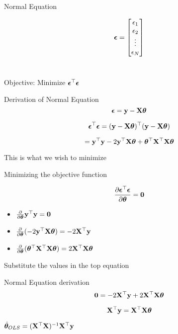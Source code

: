 \documentclass{beamer}
\begin{document}
\begin{frame}{Normal Equation}
    
\begin{equation*}
 \boldsymbol{\epsilon} = 
\begin{bmatrix}
    \epsilon_{1} \\
    \epsilon_{2} \\
    \vdots \\
    \epsilon_{N} \\
\end{bmatrix}
\end{equation*}
\\
\begin{center}
 \pause Objective:   Minimize $\boldsymbol{\epsilon}^\top\boldsymbol{\epsilon}$    
\end{center}
\end{frame}

\begin{frame}{Derivation of Normal Equation}
$$\boldsymbol{\epsilon} = \mathbf{y} - \mathbf{X}\boldsymbol{\theta}$$

$$\boldsymbol{\epsilon}^\top\boldsymbol{\epsilon} = (\mathbf{y} - \mathbf{X}\boldsymbol{\theta})^\top(\mathbf{y} - \mathbf{X}\boldsymbol{\theta})$$

$$= \mathbf{y}^\top\mathbf{y} - 2\mathbf{y}^\top\mathbf{X}\boldsymbol{\theta} + \boldsymbol{\theta}^\top\mathbf{X}^\top\mathbf{X}\boldsymbol{\theta}$$

This is what we wish to minimize
\end{frame}

\begin{frame}{Minimizing the objective function}
    
    
    $$\frac{\partial \boldsymbol{\epsilon}^\top \boldsymbol{\epsilon}}{\partial \boldsymbol{\theta}} = \mathbf{0}$$
    
    
    
    \begin{itemize}
        \item $\frac{\partial }{\partial \boldsymbol{\theta}} \mathbf{y}^\top\mathbf{y} = \mathbf{0}$
        \item $\frac{\partial }{\partial \boldsymbol{\theta}}(-2\mathbf{y}^\top\mathbf{X}\boldsymbol{\theta} ) = -2\mathbf{X}^\top\mathbf{y}$
        \item $\frac{\partial}{\partial\boldsymbol{\theta}} (\boldsymbol{\theta}^\top\mathbf{X}^\top\mathbf{X}\boldsymbol{\theta}) = 2\mathbf{X}^\top\mathbf{X}\boldsymbol{\theta}$
    \end{itemize}
    
    Substitute the values in the top equation
    
\end{frame}

\begin{frame}{Normal Equation derivation}
$$
    \mathbf{0} = -2\mathbf{X}^\top\mathbf{y} + 2\mathbf{X}^\top\mathbf{X}\boldsymbol{\theta}
$$

$$
    \mathbf{X}^\top\mathbf{y}  = \mathbf{X}^\top\mathbf{X}\boldsymbol{\theta}
$$

\begin{tcolorbox}
\begin{center}
        $\hat{\boldsymbol{\theta}}_{OLS} = (\mathbf{X}^\top\mathbf{X})^{-1}\mathbf{X}^\top\mathbf{y}$
\end{center}
\end{tcolorbox}

\end{frame}
\end{document}

